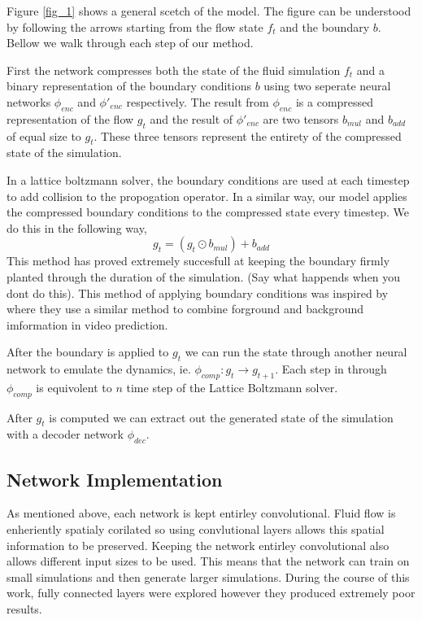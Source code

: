 \documentclass{article}
\begin{document}
Figure \ref{fig_1} shows a general scetch of the model. The figure can be understood by following the arrows starting from the flow state $f_t$ and the boundary $b$. Bellow we walk through each step of our method.

First the network compresses both the state of the fluid simulation $f_t$ and a binary representation of the boundary conditions $b$ using two seperate neural networks $\phi_{enc}$ and $\phi'_{enc}$ respectively. The result from $\phi_{enc}$ is a compressed representation of the flow $g_t$ and the result of $\phi'_{enc}$ are two tensors $b_{mul}$ and $b_{add}$ of equal size to $g_t$. These three tensors represent the entirety of the compressed state of the simulation.

In a lattice boltzmann solver, the boundary conditions are used at each timestep to add collision to the propogation operator. In a similar way, our model applies the compressed boundary conditions to the compressed state every timestep. We do this in the following way,
\begin{equation}
  g_t = (g_t \odot b_{mul}) + b_{add}
\end{equation}
This method has proved extremely succesfull at keeping the boundary firmly planted through the duration of the simulation. (Say what happends when you dont do this). This method of applying boundary conditions was inspired by\cite{vondrick2016generating} where they use a similar method to combine forground and background imformation in video prediction.

After the boundary is applied to $g_t$ we can run the state through another neural network to emulate the dynamics, ie. $\phi_{comp}:g_{t} \rightarrow g_{t+1}$. Each step in through $\phi_{comp}$ is equivolent to $n$ time step of the Lattice Boltzmann solver.

After $g_t$ is computed we can extract out the generated state of the simulation with a decoder network $\phi_{dec}$. 


\subsection{Network Implementation}

As mentioned above, each network is kept entirley convolutional. Fluid flow is enheriently spatialy corilated so using convlutional layers allows this spatial information to be preserved. Keeping the network entirley convolutional also allows different input sizes to be used. This means that the network can train on small simulations and then generate larger simulations. During the course of this work, fully connected layers were explored however they produced extremely poor results.
\end{document}
